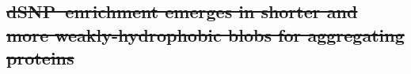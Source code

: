\documentclass[9pt,twocolumn,twoside,lineno]{pnas-new} %
\newcommand{\dSNPs}{dSNPs~}
\newcommand{\nSNPs}{nSNPs~}
\newcommand{\dSNP}{dSNP~}
\providecommand{\DIFdel}[1]{{\protect\color{red}\sout{#1}}}                      %
\begin{document}


\subsection{\DIFdel{\dSNP enrichment emerges in shorter and more weakly-hydrophobic blobs for aggregating proteins}}
\addtocounter{subsection}{-1}%
\end{document}
